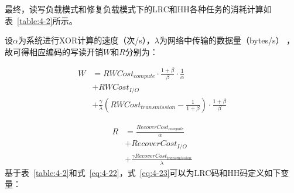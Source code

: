 最终，读写负载模式和修复负载模式下的LRC和HH各种任务的消耗计算如表~\ref{table:4-2}所示。


设$\alpha$为系统进行XOR计算的速度（次/s），$\lambda$为网络中传输的数据量（bytes/s）
，故可得相应编码的写读开销$W$和$R$分别为：

\begin{equation}
	\begin{aligned}
	\label{eq:4-22}
	W & = RWCost_{compute} \cdot \frac{1+\beta}{\beta} \cdot \frac{1}{\alpha} \\
	  & + RWCost_{I/O} \\
	  & + \frac{\gamma}{\lambda} (RWCost_{transmission} - \frac{1}{1+\beta}) \cdot \frac{1+\beta}{\beta}
	\end{aligned}
\end{equation}

\begin{equation}
	\begin{aligned}
	\label{eq:4-23}
	R & = \frac{RecoverCost_{compute}}{\alpha} \\
	& +  RecoverCost_{I/O}  \\
	& +  \frac{\gamma RecoverCost_{transmission}}{\lambda}
	\end{aligned}
\end{equation}
基于表~\ref{table:4-2}和式~\ref{eq:4-22}，式~\ref{eq:4-23}可以为LRC码和HH码定义如下变量：






